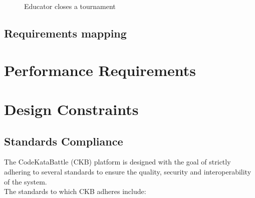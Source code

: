 \begin{enumerate}[label=\textbf{UC\arabic*}:,leftmargin=1.3cm]
            \begin{figure}[H]
                  \centering
                  \caption{Educator closes a tournament   }
                  \label{fig:Educator closes a tournament   }
            \end{figure}

\end{enumerate}
\subsection{Requirements mapping}
\section{Performance Requirements}

\section{Design Constraints}
\subsection{Standards Compliance}
The CodeKataBattle (CKB) platform is designed with the goal of strictly adhering to several standards to ensure the quality, security and interoperability of the system.\\ The standards to which CKB adheres include:

